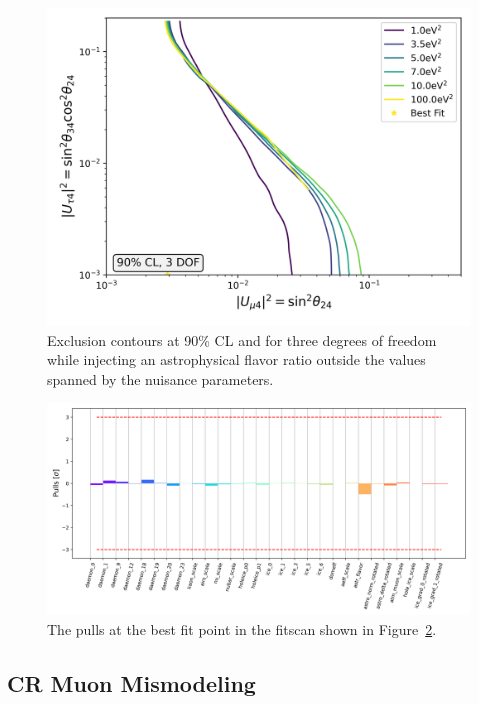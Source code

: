 \documentclass[main.tex]{subfiles}
\begin{document}
\begin{figure}
    \centering
    \includegraphics[width=0.7\linewidth]{figures/joint_astro_flavor_misfit_Realization_daemon_badflavor_Asimov_sterile_0_cl0.9_dof3.png}
    \caption{Exclusion contours at 90\% CL and for three degrees of freedom while injecting an astrophysical flavor ratio outside the values spanned by the nuisance parameters.}\label{fig:flavor_mismodel}
\end{figure}

\begin{figure}
    \centering
    \includegraphics[width=0.7\linewidth]{figures/pulls_Realization_daemon_badflavor_Asimov_sterile_0_joint_astro_flavor_misfit.png}
    \caption{The pulls at the best fit point in the fitscan shown in Figure~\ref{fig:flavor_mismodel}.}\label{fig:flavor_mismodel}
\end{figure}

\subsection{CR Muon Mismodeling}
\end{document}
